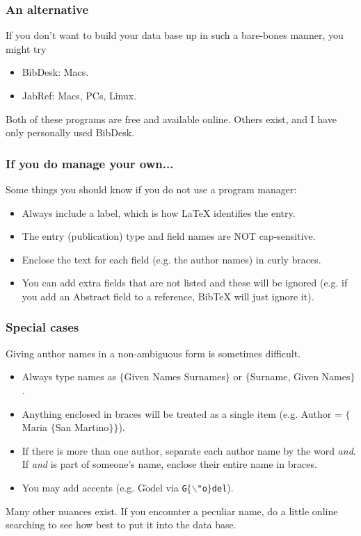 \begin{frame}  \frametitle{An alternative}
If you don't want to build your data base up in such a bare-bones manner, you might try
\begin{itemize}
\item BibDesk: Macs.
\item JabRef: Macs, PCs, Linux.
\end{itemize}
Both of these programs are free and available online. Others exist, and I have only personally used BibDesk.
\end{frame}

\begin{frame}  \frametitle{If you do manage your own...}
Some things you should know if you do not use a program manager:
\begin{itemize}
\item Always include a label, which is how LaTeX identifies the entry.
\item The entry (publication) type and field names are NOT cap-sensitive.
\item Enclose the text for each field (e.g. the author names) in curly braces.
\item You can add extra fields that are not listed and these will be ignored (e.g. if you add an Abstract field to a reference, BibTeX will just ignore it).
\end{itemize}
\end{frame}

\begin{frame}  \frametitle{Special cases}
Giving author names in a non-ambiguous form is sometimes difficult.
\begin{itemize}
\item Always type names as $\{$Given Names Surnames$\}$ or $\{$Surname, Given Names$\}$.
\item Anything enclosed in braces will be treated as a single item (e.g. Author = {\color{braces}$\{${\color{black}Maria} $\{${\color{black}San Martino}$\}\}$}).
\item If there is more than one author, separate each author name by the word \textit{and}. If \textit{and} is part of someone's name, enclose their entire name in braces.
\item You may add accents (e.g. G$\ddot{\text{o}}$del via \texttt{G$\{\backslash$"o$\}$del}).
\end{itemize}
Many other nuances exist. If you encounter a peculiar name, do a little online searching to see how best to put it into the data base.
\end{frame}

